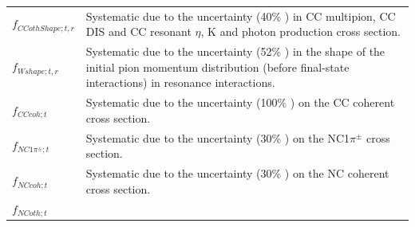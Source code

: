 {\begin{longtable}{p{1.65cm}l}
  \parbox{0.15\textwidth}
  {
    \vspace{0.1cm}
    $f_{CCothShape; t, r}$
    \vspace{0.1cm}
  }
&
  \parbox{0.81\textwidth}
  {
    \vspace{0.1cm}
    Systematic due to the uncertainty (40\% \cite{MoreNIWGErr113}) in CC multipion, CC DIS and CC resonant $\eta$, K and photon production cross section.
    \vspace{0.1cm}
  }
\\
  \parbox{0.15\textwidth}
  {
    \vspace{0.1cm}
    $f_{Wshape; t, r}$
    \vspace{0.1cm}
  }
&
  \parbox{0.81\textwidth}
  {
    \vspace{0.1cm}
    Systematic due to the uncertainty (52\% \cite{MoreNIWGErr113}) in the shape of the 
    initial pion momentum distribution (before final-state interactions) in resonance interactions. 
    \vspace{0.1cm}
  }
\\
  \parbox{0.15\textwidth}
  {
    \vspace{0.1cm}
    $f_{CCcoh; t}$
    \vspace{0.1cm}
  }
&
  \parbox{0.81\textwidth}
  {
    \vspace{0.1cm}
    Systematic due to the uncertainty (100\% \cite{MoreNIWGErr113}) on the CC coherent cross section.
    \vspace{0.1cm}
  }
\\
  \parbox{0.15\textwidth}
  {
    \vspace{0.1cm}
    $f_{NC1\pi^\pm; t}$
    \vspace{0.1cm}
  }
&
  \parbox{0.81\textwidth}
  {
    \vspace{0.1cm}
    Systematic due to the uncertainty (30\% \cite{MoreNIWGErr113}) on the NC1$\pi^\pm$ cross section.
    \vspace{0.1cm}
  }
\\
  \parbox{0.15\textwidth}
  {
    \vspace{0.1cm}
    $f_{NCcoh; t}$
    \vspace{0.1cm}
  }
&
  \parbox{0.81\textwidth}
  {
    \vspace{0.1cm}
    Systematic due to the uncertainty (30\% \cite{MoreNIWGErr113}) on the NC coherent cross section.
    \vspace{0.1cm}
  }
\\
 \parbox{0.15\textwidth}
  {
    \vspace{0.1cm}
    $f_{NCoth; t}$
}
\end{longtable}}
